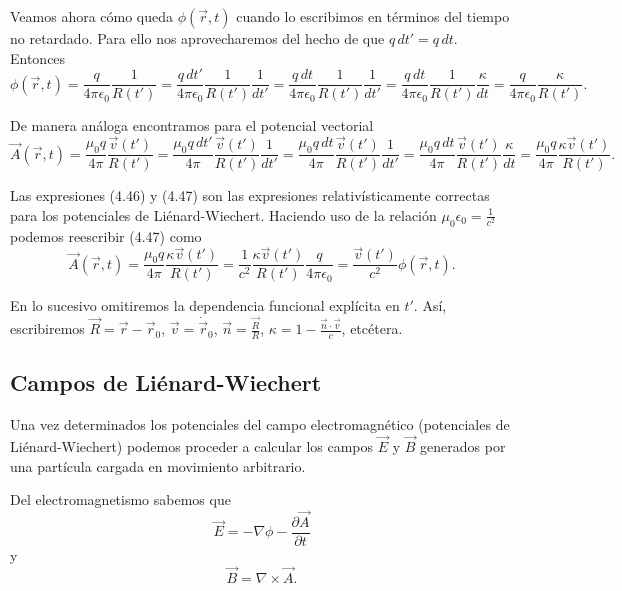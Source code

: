 \documentclass[12pt,a4paper]{book}
\begin{document}
Veamos ahora cómo queda $\phi(\vec{r}, t)$ cuando lo escribimos en términos del tiempo no retardado. Para ello nos aprovecharemos del hecho de que $q\,dt' = q\,dt$. Entonces
\begin{equation}
\phi(\vec{r}, t) = \frac{q}{4\pi\epsilon_0}\frac{1}{R(t')} = \frac{q\,dt'}{4\pi\epsilon_0}\frac{1}{R(t')}\frac{1}{dt'} = \frac{q\,dt}{4\pi\epsilon_0}\frac{1}{R(t')}\frac{1}{dt'} = \frac{q\,dt}{4\pi\epsilon_0}\frac{1}{R(t')}\frac{\kappa}{dt} = \frac{q}{4\pi\epsilon_0}\frac{\kappa}{R(t')}.
\end{equation}

De manera análoga encontramos para el potencial vectorial
\begin{equation}
\vec{A}(\vec{r}, t) = \frac{\mu_0 q}{4\pi}\frac{\vec{v}(t')}{R(t')} = \frac{\mu_0 q\,dt'}{4\pi}\frac{\vec{v}(t')}{R(t')}\frac{1}{dt'} = \frac{\mu_0 q\,dt}{4\pi}\frac{\vec{v}(t')}{R(t')}\frac{1}{dt'} = \frac{\mu_0 q\,dt}{4\pi}\frac{\vec{v}(t')}{R(t')}\frac{\kappa}{dt} = \frac{\mu_0 q}{4\pi}\frac{\kappa\vec{v}(t')}{R(t')}.
\end{equation}

Las expresiones (4.46) y (4.47) son las expresiones relativísticamente correctas para los potenciales de Liénard-Wiechert. Haciendo uso de la relación $\mu_0\epsilon_0 = \frac{1}{c^2}$ podemos reescribir (4.47) como
\begin{equation}
\vec{A}(\vec{r}, t) = \frac{\mu_0 q}{4\pi}\frac{\kappa\vec{v}(t')}{R(t')} = \frac{1}{c^2}\frac{\kappa\vec{v}(t')}{R(t')}\frac{q}{4\pi\epsilon_0} = \frac{\vec{v}(t')}{c^2}\phi(\vec{r}, t).
\end{equation}

En lo sucesivo omitiremos la dependencia funcional explícita en $t'$. Así, escribiremos $\vec{R} = \vec{r} - \vec{r}_0$, $\vec{v} = \dot{\vec{r}}_0$, $\vec{n} = \frac{\vec{R}}{R}$, $\kappa = 1 - \frac{\vec{n} \cdot \vec{v}}{c}$, etcétera.

\subsection{Campos de Liénard-Wiechert}

Una vez determinados los potenciales del campo electromagnético (potenciales de Liénard-Wiechert) podemos proceder a calcular los campos $\vec{E}$ y $\vec{B}$ generados por una partícula cargada en movimiento arbitrario.

Del electromagnetismo sabemos que
\begin{equation}
\vec{E} = -\nabla\phi - \frac{\partial\vec{A}}{\partial t}
\end{equation}
y
\begin{equation}
\vec{B} = \nabla \times \vec{A}.
\end{equation}
\end{document}
